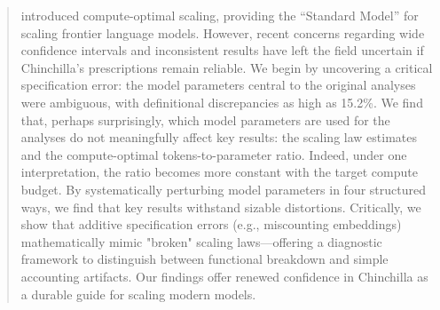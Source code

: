\documentclass{article}
\theoremstyle{plain}
\theoremstyle{definition}
\theoremstyle{remark}
\begin{document}
\printAffiliationsAndNotice{}  %

\begin{abstract}
\citet{hoffman2022chinchilla} introduced compute-optimal scaling, providing the ``Standard Model'' for scaling frontier language models.
However, recent concerns regarding wide confidence intervals and inconsistent results have left the field uncertain if Chinchilla’s prescriptions remain reliable. We begin by uncovering a critical specification error: the model parameters central to the original analyses were ambiguous, with definitional discrepancies as high as 15.2\%.
We find that, perhaps surprisingly, which model parameters are used for the analyses do not meaningfully affect key results: the scaling law estimates and the compute-optimal tokens-to-parameter ratio. Indeed, under one interpretation, the ratio becomes more constant with the target compute budget.
By systematically perturbing model parameters in four structured ways, we find that key results withstand sizable distortions. Critically, we show that additive specification errors (e.g., miscounting embeddings) mathematically mimic "broken" scaling laws—offering a diagnostic framework to distinguish between functional breakdown and simple accounting artifacts. Our findings offer renewed confidence in Chinchilla as a durable guide for scaling modern models.
\end{abstract}









\clearpage
\appendix
\onecolumn


% 
\end{document}

